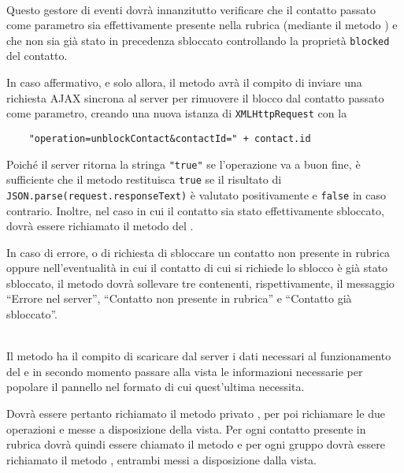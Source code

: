 \begin{description}
\item{}\\
Questo gestore di eventi dovrà innanzitutto verificare che il contatto passato come parametro sia effettivamente presente nella rubrica (mediante il metodo ) e che non sia già stato in precedenza sbloccato controllando la proprietà \verb'blocked' del contatto.

In caso affermativo, e solo allora, il metodo avrà il compito di inviare una richiesta AJAX sincrona al server per rimuovere il blocco dal contatto passato come parametro, creando una nuova istanza di \verb'XMLHttpRequest' con la 
\begin{verbatim}
    "operation=unblockContact&contactId=" + contact.id
\end{verbatim}

Poiché il server ritorna la stringa \verb'"true"' se l'operazione va a buon fine, è sufficiente che il metodo restituisca \verb'true' se il risultato di \verb'JSON.parse(request.responseText)' è valutato positivamente e \verb'false' in caso contrario. Inoltre, nel caso in cui il contatto sia stato effettivamente sbloccato, dovrà essere richiamato il metodo  del .

In caso di errore, o di richiesta di sbloccare un contatto non presente in rubrica oppure nell'eventualità in cui il contatto di cui si richiede lo sblocco è già stato sbloccato, il metodo dovrà sollevare tre  contenenti, rispettivamente, il messaggio ``Errore nel server'', ``Contatto non presente in rubrica'' e ``Contatto già sbloccato''.

\item{}\\
Il metodo ha il compito di scaricare dal server i dati necessari al funzionamento del  e in secondo momento passare alla vista le informazioni necessarie per popolare il pannello nel formato di cui quest'ultima necessita.

Dovrà essere pertanto richiamato il metodo privato , per poi richiamare le due operazioni  e  messe a disposizione della vista. Per ogni contatto presente in rubrica dovrà quindi essere chiamato il metodo  e per ogni gruppo dovrà essere richiamato il metodo , entrambi messi a disposizione dalla vista.


\end{description}
